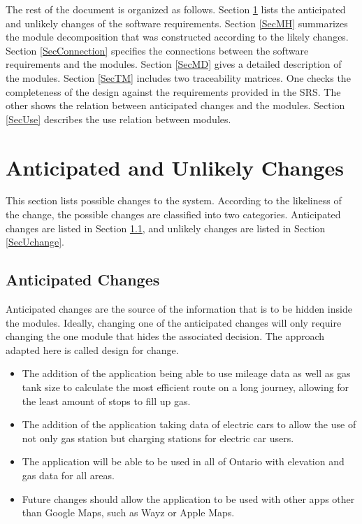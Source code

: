\documentclass[12pt, titlepage]{article}
\newcounter{acnum}
\newcommand{\actheacnum}{AC\theacnum}
\begin{document}
The rest of the document is organized as follows. Section
\ref{SecChange} lists the anticipated and unlikely changes of the software
requirements. Section \ref{SecMH} summarizes the module decomposition that
was constructed according to the likely changes. Section \ref{SecConnection}
specifies the connections between the software requirements and the
modules. Section \ref{SecMD} gives a detailed description of the
modules. Section \ref{SecTM} includes two traceability matrices. One checks
the completeness of the design against the requirements provided in the SRS. The
other shows the relation between anticipated changes and the modules. Section
\ref{SecUse} describes the use relation between modules.

\section{Anticipated and Unlikely Changes} \label{SecChange}

This section lists possible changes to the system. According to the likeliness
of the change, the possible changes are classified into two
categories. Anticipated changes are listed in Section \ref{SecAchange}, and
unlikely changes are listed in Section \ref{SecUchange}.

\subsection{Anticipated Changes} \label{SecAchange}

Anticipated changes are the source of the information that is to be hidden
inside the modules. Ideally, changing one of the anticipated changes will only
require changing the one module that hides the associated decision. The approach
adapted here is called design for
change.

\noindent \begin{itemize}

\item[\refstepcounter{acnum}\actheacnum\label{Long Journey}:] The addition of the application being able to use mileage data as well as gas tank size to calculate the most efficient route on a long journey, allowing for the least amount of stops to fill up gas.

\item[\refstepcounter{acnum}\actheacnum\label{Electric Cars}:] The addition of the application taking data of electric cars to allow the use of not only gas station but charging stations for electric car users.

\item[\refstepcounter{acnum}\actheacnum\label{Bigger Area}:] The application will be able to be used in all of Ontario with elevation and gas data for all areas.

\item[\refstepcounter{acnum}\actheacnum\label{Application Integration}:] Future changes should allow the application to be used with other apps other than Google Maps, such as Wayz or Apple Maps.

\end{itemize}
\end{document}
